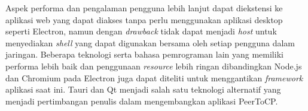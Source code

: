 Aspek performa dan pengalaman pengguna lebih lanjut dapat diekstensi ke aplikasi web yang dapat diakses tanpa perlu menggunakan aplikasi desktop seperti Electron, namun dengan \textit{drawback} tidak dapat menjadi \textit{host} untuk menyediakan \textit{shell} yang dapat digunakan bersama oleh setiap pengguna dalam jaringan. Beberapa teknologi serta bahasa pemrograman lain yang memiliki performa lebih baik dan penggunaan \textit{resource} lebih ringan dibandingkan Node.js dan Chromium pada Electron juga dapat diteliti untuk menggantikan \textit{framework} aplikasi saat ini. Tauri dan Qt menjadi salah satu teknologi alternatif yang menjadi pertimbangan penulis dalam mengembangkan aplikasi PeerToCP.